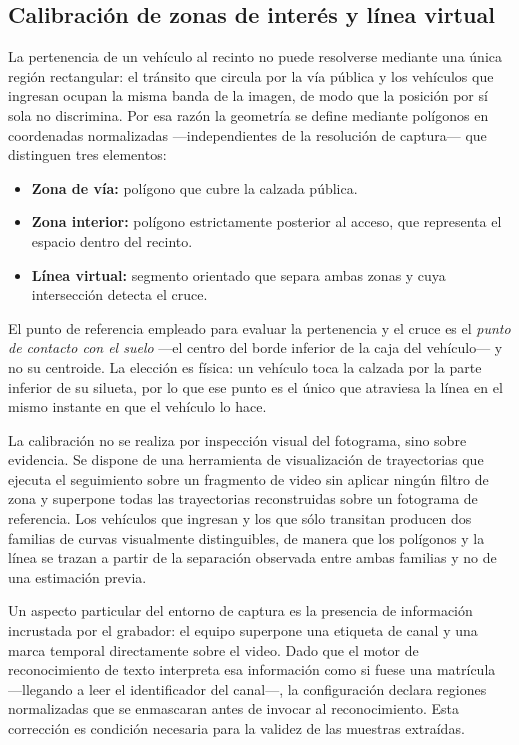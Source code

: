 \subsection{Calibración de zonas de interés y línea virtual}

La pertenencia de un vehículo al recinto no puede resolverse mediante una única
región rectangular: el tránsito que circula por la vía pública y los vehículos
que ingresan ocupan la misma banda de la imagen, de modo que la posición por sí
sola no discrimina. Por esa razón la geometría se define mediante polígonos en
coordenadas normalizadas ---independientes de la resolución de captura--- que
distinguen tres elementos:

\begin{itemize}
    \item \textbf{Zona de vía:} polígono que cubre la calzada pública.
    \item \textbf{Zona interior:} polígono estrictamente posterior al acceso, que
        representa el espacio dentro del recinto.
    \item \textbf{Línea virtual:} segmento orientado que separa ambas zonas y
        cuya intersección detecta el cruce.
\end{itemize}

El punto de referencia empleado para evaluar la pertenencia y el cruce es el
\textit{punto de contacto con el suelo} ---el centro del borde inferior de la caja
del vehículo--- y no su centroide. La elección es física: un vehículo toca la
calzada por la parte inferior de su silueta, por lo que ese punto es el único que
atraviesa la línea en el mismo instante en que el vehículo lo hace.

La calibración no se realiza por inspección visual del fotograma, sino sobre
evidencia. Se dispone de una herramienta de visualización de trayectorias que
ejecuta el seguimiento sobre un fragmento de video sin aplicar ningún
filtro de zona y superpone todas las trayectorias reconstruidas sobre un
fotograma de referencia. Los vehículos que ingresan y los que sólo transitan
producen dos familias de curvas visualmente distinguibles, de manera que los
polígonos y la línea se trazan a partir de la separación observada entre ambas
familias y no de una estimación previa.

Un aspecto particular del entorno de captura es la presencia de información
incrustada por el grabador: el equipo superpone una etiqueta de canal y una marca
temporal directamente sobre el video. Dado que el motor de reconocimiento de
texto interpreta esa información como si fuese una matrícula ---llegando a leer
el identificador del canal---, la configuración declara regiones normalizadas que
se enmascaran antes de invocar al reconocimiento. Esta corrección es condición
necesaria para la validez de las muestras extraídas.


